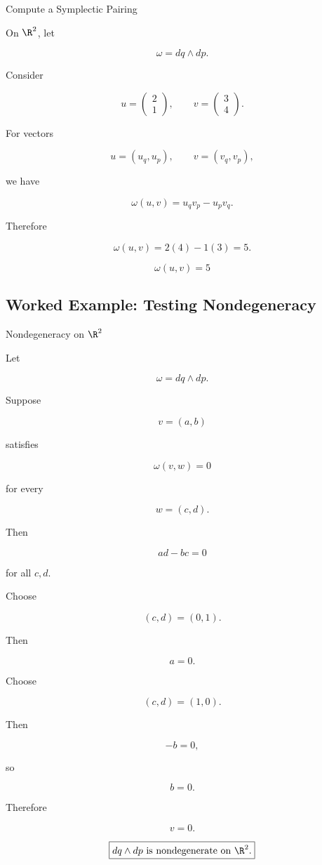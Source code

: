 \begin{workedexamplebox}{Compute a Symplectic Pairing}

On \(\R^2\), let

\[
\omega=dq\wedge dp.
\]

Consider

\[
u=
\begin{pmatrix}
2\\1
\end{pmatrix},
\qquad
v=
\begin{pmatrix}
3\\4
\end{pmatrix}.
\]

For vectors

\[
u=(u_q,u_p),
\qquad
v=(v_q,v_p),
\]

we have

\[
\omega(u,v)
=
u_qv_p-u_pv_q.
\]

Therefore

\[
\omega(u,v)
=
2(4)-1(3)
=
5.
\]

\begin{answerbox}
\[
\boxed{\omega(u,v)=5}
\]
\end{answerbox}
\end{workedexamplebox}

\subsection{Worked Example: Testing Nondegeneracy}
\label{subsec:worked-symplectic-nondegeneracy}

\begin{workedexamplebox}{Nondegeneracy on \(\R^2\)}

Let

\[
\omega=dq\wedge dp.
\]

Suppose

\[
v=(a,b)
\]

satisfies

\[
\omega(v,w)=0
\]

for every

\[
w=(c,d).
\]

Then

\[
ad-bc=0
\]

for all \(c,d\).

Choose

\[
(c,d)=(0,1).
\]

Then

\[
a=0.
\]

Choose

\[
(c,d)=(1,0).
\]

Then

\[
-b=0,
\]

so

\[
b=0.
\]

Therefore

\[
v=0.
\]

\begin{answerbox}
\[
\boxed{
dq\wedge dp
\text{ is nondegenerate on }\R^2.
}
\]
\end{answerbox}
\end{workedexamplebox}

